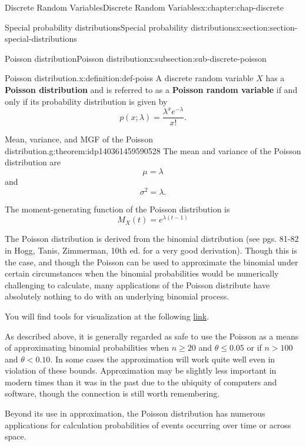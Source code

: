 \documentclass[oneside,10pt,]{book}
\newcommand{\terminology}[1]{\textbf{#1}}
\numberwithin{equation}{section}
\newcommand{\lt}{<}
\newcommand{\gt}{>}
\begin{document}
\begin{chapterptx}{Discrete Random Variables}{}{Discrete Random Variables}{}{}{x:chapter:chap-discrete}
\begin{sectionptx}{Special probability distributions}{}{Special probability distributions}{}{}{x:section:section-special-distributions}
\begin{subsectionptx}{Poisson distribution}{}{Poisson distribution}{}{}{x:subsection:sub-discrete-poisson}
\begin{introduction}{}
\end{introduction}%
\begin{definition}{Poisson distribution.}{x:definition:def-poiss}%
A discrete random variable \(\displaystyle X\) has a \terminology{Poisson distribution} and is referred to as a \terminology{Poisson random variable} if and only if its probability distribution is given by%
\begin{equation*}
p(x; \lambda) = \dfrac{\lambda^x
e^{-\lambda}}{x!}\text{.}
\end{equation*}
%
\end{definition}
\begin{theorem}{Mean, variance, and MGF of the Poisson distribution.}{}{g:theorem:idp140361459590528}%
The mean and variance of the Poisson distribution are%
\begin{equation*}
\mu =
\lambda
\end{equation*}
and%
\begin{equation*}
\sigma^2 = \lambda\text{.}
\end{equation*}
%
\par
The moment-generating function of the Poisson distribution is%
\begin{equation*}
M_X(t)
= e^{\lambda(t-1)}
\end{equation*}
%
\end{theorem}
The Poisson distribution is derived from the binomial distribution (see pgs. 81-82 in Hogg, Tanis, Zimmerman, 10th ed. for a very good derivation).  Though this is the case, and though the Poisson can be used to approximate the binomial under certain circumstances when the binomial probabilities would be numerically challenging to calculate, many applications of the Poisson distribute have absolutely nothing to do with an underlying binomial process.%
\par
You will find tools for visualization at the following \href{https://buddy.uco.edu/shiny/slaverty/mathstat/BinPoi/}{link}.%
\par
As described above, it is generally regarded as safe to use the Poisson as a means of approximating binomial probabilities when \(n \ge
20\) and \(\theta \le 0.05\) or if \(n \gt 100\) and \(\theta
\lt 0.10\).  In some cases the approximation will work quite well even in violation of these bounds. Approximation may be slightly less important in modern times than it was in the past due to the ubiquity of computers and software, though the connection is still worth remembering.%
\par
Beyond its use in approximation, the Poisson distribution has numerous applications for calculation probabilities of events occurring over time or across space.%

\end{subsectionptx}
\end{sectionptx}
\end{chapterptx}
\end{document}
